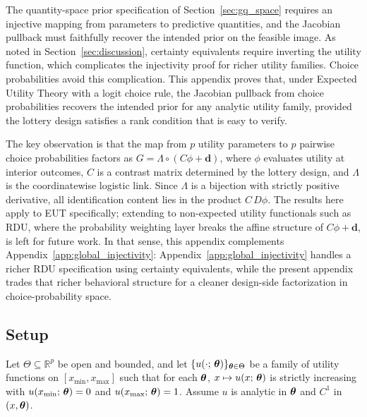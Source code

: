 \label{app:eut_choice_probs}

The quantity-space prior specification of Section~\ref{sec:gq_space}
requires an injective mapping from parameters to predictive quantities,
and the Jacobian pullback must faithfully recover the intended prior on
the feasible image. As noted in Section~\ref{sec:discussion}, certainty
equivalents require inverting the utility function, which complicates the
injectivity proof for richer utility families. Choice probabilities
avoid this complication. This appendix proves that, under Expected
Utility Theory with a logit choice rule, the Jacobian pullback from
choice probabilities recovers the intended prior for any analytic
utility family, provided the lottery design satisfies a rank condition
that is easy to verify.

The key observation is that the map from $p$ utility parameters to $p$
pairwise choice probabilities factors as
$G = \Lambda \circ (C\phi + \mathbf{d})$, where $\phi$ evaluates utility
at interior outcomes, $C$ is a contrast matrix determined by the lottery
design, and $\Lambda$ is the coordinatewise logistic link. Since
$\Lambda$ is a bijection with strictly positive derivative, all
identification content lies in the product $C\,D\phi$. The results here
apply to EUT specifically; extending to non-expected utility functionals
such as RDU, where the probability weighting layer breaks the affine
structure of $C\phi + \mathbf{d}$, is left for future work.
In that sense, this appendix complements Appendix~\ref{app:global_injectivity}:
Appendix~\ref{app:global_injectivity} handles a richer RDU specification using
certainty equivalents, while the present appendix trades that richer behavioral
structure for a cleaner design-side factorization in choice-probability space.


\subsection{Setup}

Let $\Theta \subseteq \mathbb{R}^p$ be open and bounded, and let
$\{u(\cdot;\,\boldsymbol{\theta})\}_{\boldsymbol{\theta} \in \Theta}$
be a family of utility functions on $[x_{\min}, x_{\max}]$ such that for
each $\boldsymbol{\theta}$, $x \mapsto u(x;\,\boldsymbol{\theta})$ is
strictly increasing with $u(x_{\min};\,\boldsymbol{\theta}) = 0$ and
$u(x_{\max};\,\boldsymbol{\theta}) = 1$. Assume $u$ is analytic in
$\boldsymbol{\theta}$ and $C^1$ in $(x,\boldsymbol{\theta})$.

